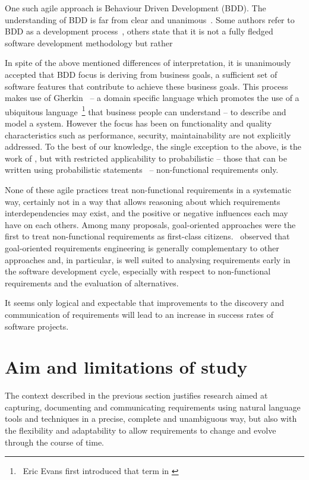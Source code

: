 \documentclass[dissertation,final]{softeng}
\begin{document}
{One such agile approach is Behaviour Driven Development (BDD). The understanding of BDD is far from clear and unanimous~\citep{Solis0}. Some authors refer to BDD as a development process~\citep{Smart201410}, others state that it is not a fully fledged software development methodology but rather \emph{}

In spite of the above mentioned differences of interpretation, it is unanimously accepted that BDD focus is deriving from  business goals, a sufficient set of software features that contribute to achieve these business goals. This process makes use of Gherkin~\citep{wynne2012cucumber} -- a domain specific language which promotes the use of a ubiquitous language~\footnote{~Eric Evans first introduced that term in  \citet{evans2004domain}}  that business people can understand -- to describe and model a system. However the focus has been on functionality and quality characteristics such as performance, security, maintainability are not explicitly addressed. To the best of our knowledge, the single exception to the above, is the work of \citet{barmi2011automated}, but with restricted applicability to probabilistic -- those that can be written using probabilistic statements~\citep{grunske2008specification} -- non-functional requirements only.

None of these agile practices treat non-functional requirements in a systematic way, certainly not in a way that allows reasoning about which requirements interdependencies may exist, and the positive or negative influences each may have on each others. Among many proposals, goal-oriented approaches were the first to treat non-functional requirements as first-class citizens.~\citet{Mylopoulos:1999jh} observed that goal-oriented requirements engineering is generally complementary to other approaches and, in particular, is well suited to analysing requirements early in the software development cycle, especially with respect to non-functional requirements and the evaluation of alternatives. 

It seems only logical and expectable that improvements to the discovery and communication of requirements will lead to an increase in success rates of software projects.

\section{Aim and limitations of study}
The context described in the previous section justifies research aimed at capturing, documenting and communicating requirements using natural language tools and techniques in a precise, complete and unambiguous way, but also with the flexibility and adaptability to allow requirements to change and evolve through the course of time.

}
\end{document}
